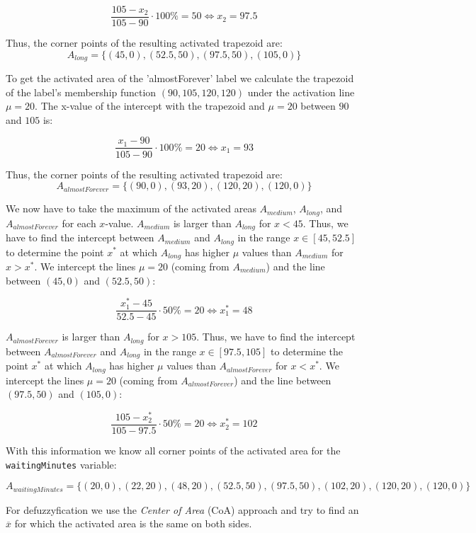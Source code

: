 \[ \frac{105-x_2}{105-90} \cdot 100\% = 50 \Leftrightarrow x_2 = 97.5 \]

Thus, the corner points of the resulting activated trapezoid are: 
\[A_{long} = \{ (45,0), (52.5,50), (97.5,50), (105,0) \}\]



To get the activated area of the 'almostForever' label we calculate the trapezoid of the label's membership function $(90,105,120,120)$ under the activation line $\mu = 20$. The x-value of the intercept with the trapezoid and $\mu = 20$ between $90$ and $105$ is:

\[ \frac{x_1-90}{105-90} \cdot 100\% = 20 \Leftrightarrow x_1 = 93 \]

Thus, the corner points of the resulting activated trapezoid are: 
\[A_{almostForever} = \{ (90,0),(93,20),(120,20),(120,0) \}\]


We now have to take the maximum of the activated areas $A_{medium}$, $A_{long}$, and $A_{almostForever}$ for each $x$-value. $A_{medium}$ is  larger than $A_{long}$ for $ x < 45 $. Thus, we have to find the intercept between  $A_{medium}$ and $A_{long}$ in the range $ x \in [45,52.5]$ to determine the point $x^*$ at which $A_{long}$ has higher $\mu$ values than $A_{medium}$ for $x > x^*$. We intercept the lines $\mu = 20$ (coming from $A_{medium}$) and the line between $(45,0)$ and  $(52.5,50)$:

\[ \frac{x_1^*-45}{52.5-45} \cdot 50\% = 20 \Leftrightarrow x_1^* = 48 \]

$A_{almostForever}$ is  larger than $A_{long}$ for $ x > 105 $. Thus, we have to find the intercept between  $A_{almostForever}$ and $A_{long}$ in the range $ x \in [97.5,105]$ to determine the point $x^*$ at which $A_{long}$ has higher $\mu$ values than $A_{almostForever}$ for $x < x^*$. We intercept the lines $\mu = 20$ (coming from $A_{almostForever}$) and the line between $(97.5,50)$ and  $(105,0)$:

\[ \frac{105-x_2^*}{105-97.5} \cdot 50\% = 20 \Leftrightarrow x_2^* = 102 \]


With this information we know all corner points of the activated area for the \texttt{waitingMinutes} variable:

\[ A_{waitingMinutes} = \{ (20,0),(22,20),(48,20),(52.5,50),(97.5,50),(102,20),(120,20),(120,0)  \}\]

For defuzzyfication we use the \textit{Center of Area} (CoA) approach and try to find an $\overline{x}$ for which the activated area is the same on both sides.

